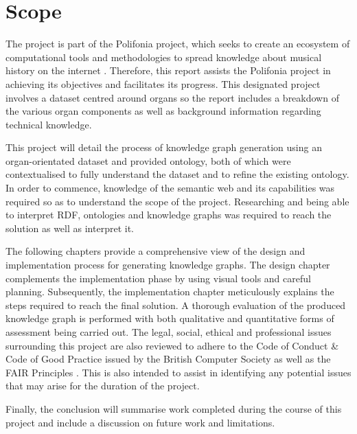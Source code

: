 \section{Scope}
The project is part of the Polifonia project, which seeks to create an ecosystem of computational tools and methodologies to spread knowledge about musical history on the internet \cite{polifoniaproject}. Therefore, this report assists the Polifonia project in achieving its objectives and facilitates its progress. This designated project involves a dataset centred around organs so the report includes a breakdown of the various organ components as well as background information regarding technical knowledge.

This project will detail the process of knowledge graph generation using an organ-orientated dataset and provided ontology, both of which were contextualised to fully understand the dataset and to refine the existing ontology. In order to commence, knowledge of the semantic web and its capabilities was required so as to understand the scope of the project. Researching and being able to interpret RDF, ontologies and knowledge graphs was required to reach the solution as well as interpret it. 

The following chapters provide a comprehensive view of the design and implementation process for generating knowledge graphs. The design chapter complements the implementation phase by using visual tools and careful planning. Subsequently, the implementation chapter meticulously explains the steps required to reach the final solution. A thorough evaluation of the produced knowledge graph is performed with both qualitative and quantitative forms of assessment being carried out. The legal, social, ethical and professional issues surrounding this project are also reviewed to adhere to the Code of Conduct \& Code of Good Practice issued by the British Computer Society \cite{bcs} as well as the FAIR Principles \cite{fairprinciples}. This is also intended to assist in identifying any potential issues that may arise for the duration of the project.

Finally, the conclusion will summarise work completed during the course of this project and include a discussion on future work and limitations. 
